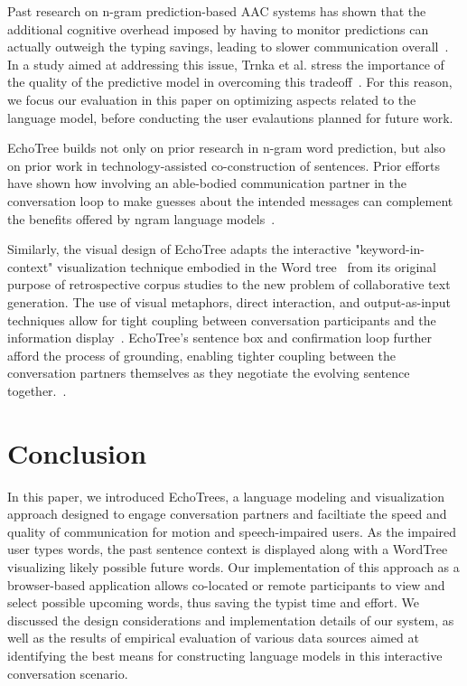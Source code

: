 \documentclass{sigchi}
\begin{document}
Past research on n-gram prediction-based AAC systems has shown that the additional cognitive overhead imposed by having to monitor predictions can actually outweigh the typing savings, leading to slower communication overall~\cite{venkatagiri1993, koester1994}. In a study aimed at addressing this issue, Trnka et al. stress the importance of the quality of the predictive model in overcoming this tradeoff~\cite{Trnka2009}. For this reason, we focus our evaluation in this paper on optimizing aspects related to the language model, before conducting the user evalautions planned for future work.

EchoTree builds not only on prior research in n-gram word prediction,
but also on prior work in technology-assisted co-construction of
sentences. Prior efforts have shown how involving an able-bodied
communication partner in the conversation loop to make guesses about
the intended messages can complement the benefits offered by ngram
language models~\cite{Roark2011}. 

Similarly, the visual design of EchoTree adapts the interactive
"keyword-in-context" visualization technique embodied in the Word
tree~\cite{Wattenberg2008} from its original purpose of retrospective
corpus studies to the new problem of collaborative text
generation. The use of visual metaphors, direct interaction, and
output-as-input techniques allow for tight coupling between
conversation participants and the information
display~\cite{Ahlberg1994}. EchoTree's sentence box and confirmation
loop further afford the process of grounding, enabling tighter
coupling between the conversation partners themselves as they
negotiate the evolving sentence together.~\cite{clark1991}.

\section{Conclusion}
In this paper, we introduced EchoTrees, a language modeling and visualization approach designed to engage conversation partners and faciltiate the speed and quality of communication for motion and speech-impaired users. As the impaired user types words, the past sentence context is displayed along with a WordTree visualizing likely possible future words. Our implementation of this approach as a browser-based application allows co-located or remote participants to view and select possible upcoming words, thus saving the typist time and effort. We discussed the design considerations and implementation details of our system, as well as the results of empirical evaluation of various data sources aimed at identifying the best means for constructing language models in this interactive conversation scenario.
\end{document}
